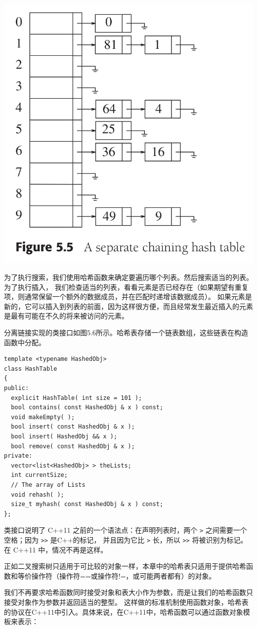 \documentclass[a4paper]{ctexart}
\theoremstyle{definition}
\theoremstyle{definition}
\begin{document}
\begin{center}
  \includegraphics[width = 0.5 \textwidth]{images/seprate_chaining.png}
\end{center}

为了执行搜索，我们使用哈希函数来确定要遍历哪个列表。然后搜索适当的列表。为了执行插入，
我们检查适当的列表，看看元素是否已经存在（如果期望有重复项，则通常保留一个额外的数据成员，并在匹配时递增该数据成员）。
如果元素是新的，它可以插入到列表的前面，因为这样很方便，而且经常发生最近插入的元素是最有可能在不久的将来被访问的元素。

分离链接实现的类接口如图5.6所示。哈希表存储一个链表数组，这些链表在构造函数中分配。

\begin{lstlisting}
template <typename HashedObj>
class HashTable
{
public:
  explicit HashTable( int size = 101 );
  bool contains( const HashedObj & x ) const;
  void makeEmpty( );
  bool insert( const HashedObj & x );
  bool insert( HashedObj && x );
  bool remove( const HashedObj & x );
private:
  vector<list<HashedObj> > theLists;
  int currentSize;
  // The array of Lists
  void rehash( );
  size_t myhash( const HashedObj & x ) const;
};  
\end{lstlisting}

类接口说明了 C++11 之前的一个语法点：在声明列表时，两个 \verb|>| 之间需要一个空格；因为 \verb|>>| 是C++的标记，
并且因为它比 \verb|>| 长，所以 \verb|>>| 将被识别为标记。在 C++11 中，情况不再是这样。

正如二叉搜索树只适用于可比较的对象一样，本章中的哈希表只适用于提供哈希函数和等价操作符（操作符==或操作符!=，或可能两者都有）的对象。

我们不再要求哈希函数同时接受对象和表大小作为参数，而是让我们的哈希函数只接受对象作为参数并返回适当的整型。
这样做的标准机制使用函数对象，哈希表的协议在C++11中引入。具体来说，在C++11中，哈希函数可以通过函数对象模板来表示：
\end{document}

